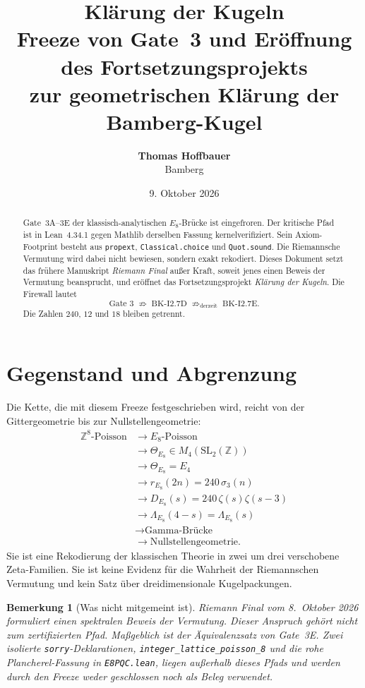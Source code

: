 \documentclass[11pt,a4paper]{article}
\title{\textbf{\Large Kl\"arung der Kugeln}\\[0.45em]
  \large Freeze von Gate~3 und Er\"offnung des Fortsetzungsprojekts\\
  zur geometrischen Kl\"arung der Bamberg-Kugel}
\author{\textbf{Thomas Hoffbauer}\\[0.2em]
  \small Bamberg}
\date{9. Oktober 2026}
\newtheorem{remark}[theorem]{Bemerkung}
\begin{document}
\maketitle

\begin{abstract}
Gate~3A--3E der klassisch-analytischen $E_8$-Br\"ucke ist eingefroren.
Der kritische Pfad ist in Lean~4.34.1 gegen Mathlib derselben Fassung
kernelverifiziert. Sein Axiom-Footprint besteht aus \texttt{propext},
\texttt{Classical.choice} und \texttt{Quot.sound}. Die Riemannsche
Vermutung wird dabei nicht bewiesen, sondern exakt rekodiert.
Dieses Dokument setzt das fr\"uhere Manuskript \emph{Riemann Final}
au\ss er Kraft, soweit jenes einen Beweis der Vermutung beansprucht,
und er\"offnet das Fortsetzungsprojekt \emph{Kl\"arung der Kugeln}.
Die Firewall lautet
\[
  \text{Gate 3} \;\not\Rightarrow\; \text{BK-I2.7D}
  \;\not\Rightarrow_{\text{derzeit}}\; \text{BK-I2.7E}.
\]
Die Zahlen $240$, $12$ und $18$ bleiben getrennt.
\end{abstract}

\section{Gegenstand und Abgrenzung}

Die Kette, die mit diesem Freeze festgeschrieben wird, reicht von der
Gittergeometrie bis zur Nullstellengeometrie:
\begin{align*}
  \mathbb{Z}^{8}\text{-Poisson}
  &\longrightarrow E_8\text{-Poisson}\\
  &\longrightarrow \Theta_{E_8}\in M_4(\mathrm{SL}_2(\mathbb{Z}))\\
  &\longrightarrow \Theta_{E_8}=E_4\\
  &\longrightarrow r_{E_8}(2n)=240\,\sigma_3(n)\\
  &\longrightarrow D_{E_8}(s)=240\,\zeta(s)\zeta(s-3)\\
  &\longrightarrow \Lambda_{E_8}(4-s)=\Lambda_{E_8}(s)\\
  &\longrightarrow \text{Gamma-Br\"ucke}\\
  &\longrightarrow \text{Nullstellengeometrie}.
\end{align*}
Sie ist eine Rekodierung der klassischen Theorie in zwei um drei
verschobene Zeta-Familien. Sie ist keine Evidenz f\"ur die Wahrheit
der Riemannschen Vermutung und kein Satz \"uber dreidimensionale
Kugelpackungen.

\begin{remark}[Was nicht mitgemeint ist]
  \emph{Riemann Final} vom 8.~Oktober 2026 formuliert einen spektralen
  Beweis der Vermutung. Dieser Anspruch geh\"ort nicht zum
  zertifizierten Pfad. Ma\ss geblich ist der \"Aquivalenzsatz von
  Gate~3E. Zwei isolierte \texttt{sorry}-Deklarationen,
  \texttt{integer\_lattice\_poisson\_8} und die rohe
  Plancherel-Fassung in \texttt{E8PQC.lean}, liegen au\ss erhalb dieses
  Pfads und werden durch den Freeze weder geschlossen noch als Beleg
  verwendet.
\end{remark}
\end{document}
